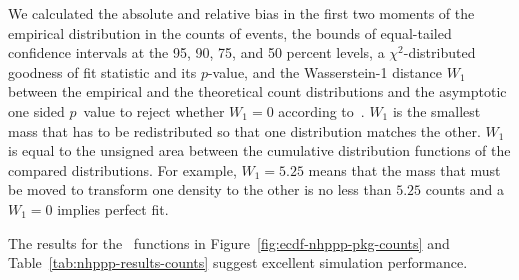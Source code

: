 \documentclass[article,nojss]{jss}\usepackage[]{graphicx}\usepackage[]{xcolor}
\begin{document}
We calculated the absolute and relative bias in the first two moments of the empirical distribution in the counts of events, the bounds of equal-tailed confidence intervals at the 95, 90, 75, and 50 percent levels, a $\chi^2$-distributed goodness of fit statistic and its $p$-value, and the Wasserstein-1 distance $W_1$ between the empirical and the theoretical count distributions and the asymptotic one sided $p$~value to reject whether $W_1 = 0$ according to~\citet{sommerfeld2018inference}. $W_1$ is the smallest mass that has to be redistributed so that one distribution matches the other. $W_1$ is equal to the unsigned area between the cumulative distribution functions of the compared distributions. For example, $W_1 = 5.25$ means that the mass that must be moved to transform one density to the other is no less than $5.25$ counts and a $W_1 = 0$ implies perfect fit.





The results for the~ functions in Figure~\ref{fig:ecdf-nhppp-pkg-counts} and Table~\ref{tab:nhppp-results-counts} suggest excellent simulation performance.
\end{document}
